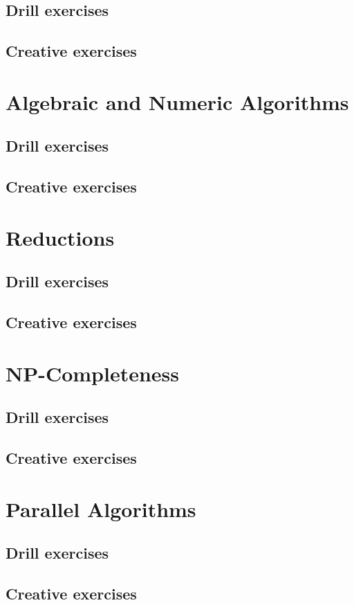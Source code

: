 \documentclass[a4paper,11pt]{memoir}
\begin{document}
    \section{Drill exercises}
    \section{Creative exercises}
    
    \chapter{Algebraic and Numeric Algorithms}
    \section{Drill exercises}
    \section{Creative exercises}

    \chapter{Reductions}
    \section{Drill exercises}
    \section{Creative exercises}

    \chapter{NP-Completeness}
    \section{Drill exercises}
    \section{Creative exercises}
    
    \chapter{Parallel Algorithms}
    \section{Drill exercises}
    \section{Creative exercises}
\end{document}
